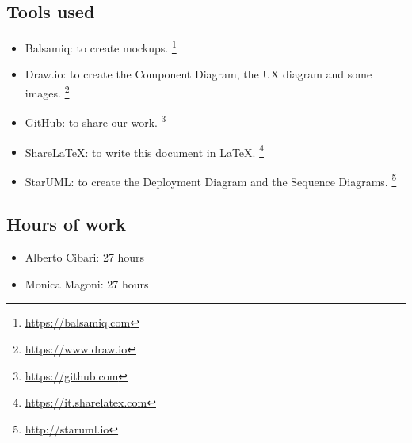 \subsection*{Tools used}
    \begin{itemize}
    \item Balsamiq: to create mockups. \footnote{\url{https://balsamiq.com}}
     \item Draw.io: to create the Component Diagram, the UX diagram and some images.
    \footnote{\url{https://www.draw.io}}
     \item GitHub: to share our work. 
    \footnote{\url{https://github.com}} 
    \item ShareLaTeX: to write this document in LaTeX. \footnote{\url{https://it.sharelatex.com}}
    \item StarUML: to create the Deployment Diagram and the Sequence Diagrams. \footnote{\url{http://staruml.io}}
    \end{itemize}

\subsection*{Hours of work}
    \begin{itemize}
    \item Alberto Cibari: 27 hours
    \item Monica Magoni: 27 hours
    \end{itemize}
